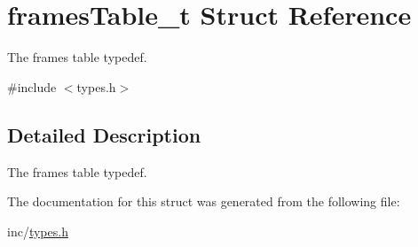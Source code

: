 \hypertarget{structframes_table__t}{
\section{framesTable\_\-t Struct Reference}
\label{structframes_table__t}
}


The frames table typedef.  




{\ttfamily \#include $<$types.h$>$}



\subsection{Detailed Description}
The frames table typedef. 

The documentation for this struct was generated from the following file:\begin{DoxyCompactItemize}
\item 
inc/\hyperlink{types_8h}{types.h}\end{DoxyCompactItemize}
